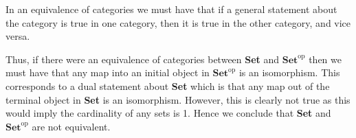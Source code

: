 \documentclass[a4paper]{article}
\begin{document}
\begin{exercise}{4}
  In an equivalence of categories we must have that if a general statement about the category is true in one category, then it is true in the other category, and vice versa.

  Thus, if there were an equivalence of categories between \textbf{Set} and $ \textbf{Set}^{\text{op}} $ then we must have that any map into an initial object in $ \textbf{Set}^{\text{op}} $ is an isomorphism. This corresponds to a dual statement about \textbf{Set} which is that any map out of the terminal object in \textbf{Set} is an isomorphism. However, this is clearly not true as this would imply the cardinality of any sets is 1. Hence we conclude that \textbf{Set} and $ \textbf{Set}^{\text{op}} $ are not equivalent.
\end{exercise}
\end{document}
